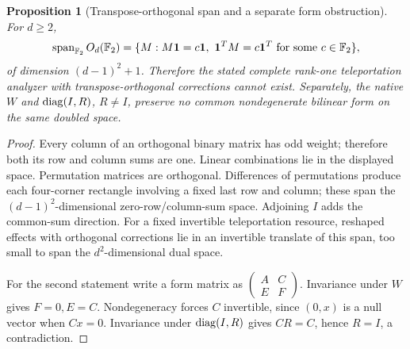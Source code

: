 \documentclass[11pt]{article}
\newtheorem{proposition}[theorem]{Proposition}
\theoremstyle{remark}
\begin{document}
\begin{proposition}[Transpose-orthogonal span and a separate form obstruction]
For $d\geq2$,
\[
 \operatorname{span}_{\mathbb F_2}O_d(\mathbb F_2)=
 \{M:M\mathbf1=c\mathbf1,\ \mathbf1^TM=c\mathbf1^T
 \text{ for some }c\in\mathbb F_2\},
\]
of dimension $(d-1)^2+1$. Therefore the stated complete rank-one teleportation
analyzer with transpose-orthogonal corrections cannot exist. Separately, the
native $W$ and $\operatorname{diag}(I,R)$, $R\ne I$, preserve no common nondegenerate
bilinear form on the same doubled space.
\end{proposition}
\begin{proof}
Every column of an orthogonal binary matrix has odd weight; therefore both its
row and column sums are one. Linear combinations lie in the displayed space.
Permutation matrices are orthogonal. Differences of permutations produce each
four-corner rectangle involving a fixed last row and column; these span the
$(d-1)^2$-dimensional zero-row/column-sum space. Adjoining $I$ adds the common-sum
direction. For a fixed invertible teleportation resource, reshaped effects with
orthogonal corrections lie in an invertible translate of this span, too small
to span the $d^2$-dimensional dual space.

For the second statement write a form matrix as
$\begin{pmatrix}A&C\\E&F\end{pmatrix}$. Invariance under $W$ gives $F=0,E=C$.
Nondegeneracy forces $C$ invertible, since $(0,x)$ is a null vector when
$Cx=0$. Invariance under $\operatorname{diag}(I,R)$ gives $CR=C$, hence $R=I$, a contradiction.
\end{proof}
\end{document}
